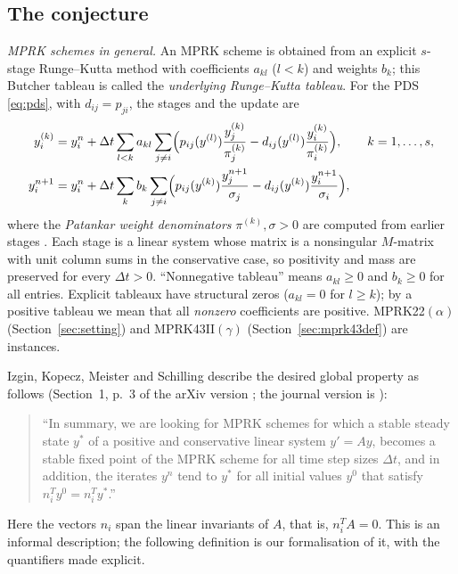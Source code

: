 \documentclass[11pt,a4paper]{article}
\theoremstyle{plain}
\theoremstyle{definition}
\begin{document}
\subsection{The conjecture}\label{sec:conjecture}

\emph{MPRK schemes in general.} An MPRK scheme is obtained from an explicit $s$-stage Runge--Kutta method with coefficients $a_{kl}$ ($l<k$) and weights $b_k$; this Butcher tableau is called the \emph{underlying Runge--Kutta tableau}. For the PDS \eqref{eq:pds}, with $d_{ij}=p_{ji}$, the stages and the update are
\begin{equation}\label{eq:mprkgeneral}
\begin{aligned}
 y^{(k)}_i&=y^n_i+\Delta t\sum_{l<k}a_{kl}\sum_{j\ne i}\Bigl(p_{ij}(y^{(l)})\frac{y^{(k)}_j}{\pi^{(k)}_j}-d_{ij}(y^{(l)})\frac{y^{(k)}_i}{\pi^{(k)}_i}\Bigr),\qquad k=1,\dots,s,\\
 y^{n+1}_i&=y^n_i+\Delta t\sum_{k}b_k\sum_{j\ne i}\Bigl(p_{ij}(y^{(k)})\frac{y^{n+1}_j}{\sigma_j}-d_{ij}(y^{(k)})\frac{y^{n+1}_i}{\sigma_i}\Bigr),
\end{aligned}
\end{equation}
where the \emph{Patankar weight denominators} $\pi^{(k)},\sigma>0$ are computed from earlier stages \cite{BDM2003,KM2018a,KM2018b}. Each stage is a linear system whose matrix is a nonsingular $M$-matrix with unit column sums in the conservative case, so positivity and mass are preserved for every $\Delta t>0$. ``Nonnegative tableau'' means $a_{kl}\ge0$ and $b_k\ge0$ for all entries. Explicit tableaux have structural zeros ($a_{kl}=0$ for $l\ge k$); by a positive tableau we mean that all \emph{nonzero} coefficients are positive. MPRK22$(\alpha)$ (Section~\ref{sec:setting}) and MPRK43II$(\gamma)$ (Section~\ref{sec:mprk43def}) are instances.

Izgin, Kopecz, Meister and Schilling describe the desired global property as follows (Section~1, p.~3 of the arXiv version \cite{IKMS2023arxiv}; the journal version is \cite{IKMS2024}):
\begin{quote}\small
``In summary, we are looking for MPRK schemes for which a stable steady state $y^*$ of a positive and conservative linear system $y'=Ay$, becomes a stable fixed point of the MPRK scheme for all time step sizes $\Delta t$, and in addition, the iterates $y^n$ tend to $y^*$ for all initial values $y^0$ that satisfy $n_i^Ty^0=n_i^Ty^*$.''
\end{quote}
Here the vectors $n_i$ span the linear invariants of $A$, that is, $n_i^TA=0$. This is an informal description; the following definition is our formalisation of it, with the quantifiers made explicit.
\end{document}
